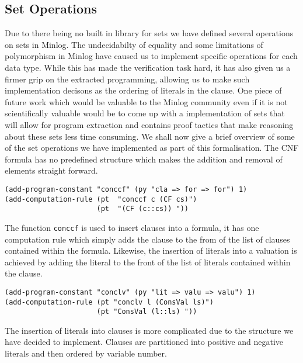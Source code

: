 \subsection*{Set Operations}
Due to there being no built in library for sets we have defined several operations on sets in Minlog. The  undecidabilty of equality and some limitations of polymorphism in Minlog have caused us to implement specific operations for each data type. While this has made the verification task hard, it has also given us a firmer grip on the extracted programming, allowing us to make such implementation decisons as the ordering of literals in the clause. One piece of future work which would be valuable to the Minlog community even if it is not scientifically valuable would be to come up with a implementation of sets that will allow for program extraction and contains proof tactics that make reasoning about these sets less time consuming. We shall now give a brief overview of some of the set operations we have implemented as part of this formalisation. The CNF formula has no predefined structure which makes the addition and removal of elements straight forward.

\begin{lstlisting}[caption = "Code for the addition and removal of clauses from formulae"]
(add-program-constant "conccf" (py "cla => for => for") 1)
(add-computation-rule (pt  "conccf c (CF cs)")
                      (pt  "(CF (c::cs)) "))
\end{lstlisting}

The function \texttt{conccf} is used to insert clauses into a formula, it has one computation rule which simply adds the clause to the from of the list of clauses contained within the formula. Likewise, the insertion of literals into a valuation is achieved by adding the literal to the front of the list of literals contained within the clause.

\begin{lstlisting}[caption = "The Function for the addition of a literal to a valuation"]
(add-program-constant "conclv" (py "lit => valu => valu") 1)
(add-computation-rule (pt "conclv l (ConsVal ls)")
                      (pt "ConsVal (l::ls) "))
\end{lstlisting}


The insertion of literals into clauses is more complicated due to the structure we have decided to implement. Clauses are partitioned into positive and negative literals and then ordered by variable number.


